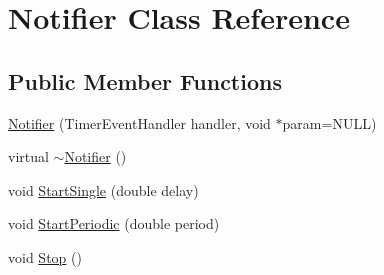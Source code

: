 \hypertarget{classNotifier}{\section{\-Notifier \-Class \-Reference}
\label{classNotifier}
}
\subsection*{\-Public \-Member \-Functions}
\begin{DoxyCompactItemize}
\item 
\hyperlink{classNotifier_add626cbc00f8e50f98dc09758d19f85a}{\-Notifier} (\-Timer\-Event\-Handler handler, void $\ast$param=\-N\-U\-L\-L)
\item 
virtual \hyperlink{classNotifier_acb1a245d3fbef36f2f96400150cef915}{$\sim$\-Notifier} ()
\item 
void \hyperlink{classNotifier_af62f654c1918a9c4256b201c5a9f78f7}{\-Start\-Single} (double delay)
\item 
void \hyperlink{classNotifier_ad86c4d07ac2947b0fa51b2ec4ed95dbf}{\-Start\-Periodic} (double period)
\item 
void \hyperlink{classNotifier_acbd1d398b7338e18d273a3acb6c1bf63}{\-Stop} ()
\end{DoxyCompactItemize}


